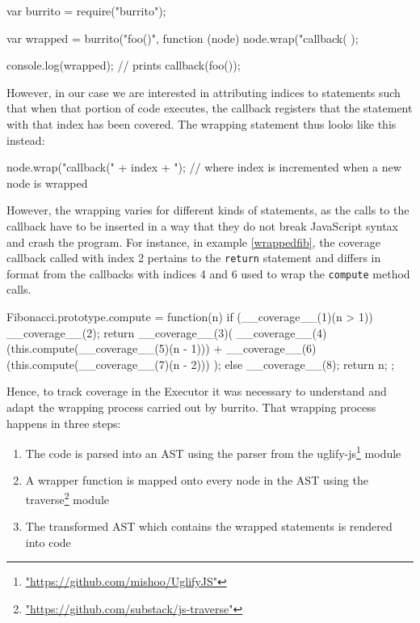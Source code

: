\begin{code}[caption=Wrapping with \textsf{burrito},label=burrito]
var burrito = require("burrito");

var wrapped = burrito("foo()", function (node) {
    node.wrap("callback(%
});

console.log(wrapped); // prints callback(foo());
\end{code}

However, in our case we are interested in attributing indices to statements such that when that portion of code executes, the callback registers that the statement with that index has been covered. The wrapping statement thus looks like this instead:

\begin{code}
node.wrap("callback(" + index + "); %
// where index is incremented when a new node is wrapped
\end{code}

However, the wrapping varies for different kinds of statements, as the calls to the callback have to be inserted in a way that they do not break JavaScript syntax and crash the program. For instance, in example \ref{wrappedfib}, the coverage callback called with index 2 pertains to the \texttt{return} statement and differs in format from the callbacks with indices 4 and 6 used to wrap the \texttt{compute} method calls.

\begin{code}[caption=Wrapped Fibonacci,label=wrappedfib]
Fibonacci.prototype.compute = function(n) {
  if (__coverage__(1)(n > 1)) {
    __coverage__(2);
    return __coverage__(3)(
               __coverage__(4)(this.compute(__coverage__(5)(n - 1))) +
               __coverage__(6)(this.compute(__coverage__(7)(n - 2)))
           );
  } else {
    __coverage__(8);
    return n;
  }
};
\end{code}

Hence, to track coverage in the \textsf{Executor} it was necessary to understand and adapt the wrapping process carried out by \textsf{burrito}. That wrapping process happens in three steps:

\begin{enumerate}
   \item The code is parsed into an AST using the parser from the \textsf{uglify-js}\footnote{\url{"https://github.com/mishoo/UglifyJS"}} module
   \item A wrapper function is mapped onto every node in the AST using the \textsf{traverse}\footnote{\url{"https://github.com/substack/js-traverse"}} module
   \item The transformed AST which contains the wrapped statements is rendered into code
\end{enumerate}

